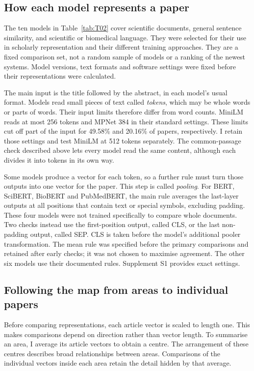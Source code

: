\documentclass[12pt]{article}
\begin{document}
\subsection{How each model represents a paper}
The ten models in Table~\ref{tab:T02} cover scientific documents, general sentence similarity, and scientific or biomedical language. They were selected for their use in scholarly representation and their different training approaches. They are a fixed comparison set, not a random sample of models or a ranking of the newest systems. Model versions, text formats and software settings were fixed before their representations were calculated.

The main input is the title followed by the abstract, in each model's usual format. Models read small pieces of text called \emph{tokens}, which may be whole words or parts of words. Their input limits therefore differ from word counts. MiniLM reads at most 256 tokens and MPNet 384 in their standard settings. These limits cut off part of the input for 49.58\% and 20.16\% of papers, respectively. I retain those settings and test MiniLM at 512 tokens separately. The common-passage check described above lets every model read the same content, although each divides it into tokens in its own way.

Some models produce a vector for each token, so a further rule must turn those outputs into one vector for the paper. This step is called \emph{pooling}. For BERT, SciBERT, BioBERT and PubMedBERT, the main rule averages the last-layer outputs at all positions that contain text or special symbols, excluding padding. These four models were not trained specifically to compare whole documents. Two checks instead use the first-position output, called CLS, or the last non-padding output, called SEP. CLS is taken before the model's additional pooler transformation. The mean rule was specified before the primary comparisons and retained after early checks; it was not chosen to maximise agreement. The other six models use their documented rules. Supplement S1 provides exact settings.


\subsection{Following the map from areas to individual papers}
Before comparing representations, each article vector is scaled to length one. This makes comparisons depend on direction rather than vector length. To summarise an area, I average its article vectors to obtain a centre. The arrangement of these centres describes broad relationships between areas. Comparisons of the individual vectors inside each area retain the detail hidden by that average.
\end{document}
